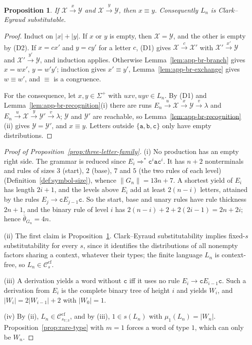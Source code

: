 \documentclass[11pt]{article}
\numberwithin{equation}{section}
\theoremstyle{plain}
\newtheorem{proposition}[theorem]{Proposition}
\theoremstyle{definition}
\theoremstyle{remark}
\theoremstyle{plain}
\newcommand{\cf}{\mathrm{cf}}
\newcommand{\Ccf}[1]{\mathcal C_{#1}^{\cf}}
\newcommand{\eps}{\lambda}
\begin{document}
\begin{proposition}\label{prop:app-br-congruence}
\label{prop:app-tl-congruence}
If $\mathcal X\xrightarrow{x}\mathcal Y$ and $\mathcal X\xrightarrow{y}\mathcal Y$, then $x\equiv y$.
Consequently $L_n$ is Clark--Eyraud substitutable.
\end{proposition}

\begin{proof}
Induct on $|x|+|y|$.  If $x$ or $y$ is empty, then $\mathcal X=\mathcal Y$, and the
other is empty by (D2).  If $x=cx'$ and $y=cy'$ for a letter $c$, (D1) gives
$\mathcal X\xrightarrow{c}\mathcal X'$ with $\mathcal X'\xrightarrow{x'}\mathcal Y$ and
$\mathcal X'\xrightarrow{y'}\mathcal Y$, and induction applies.  Otherwise
Lemma~\ref{lem:app-br-branch} gives $x=wx'$, $y=w'y'$; induction gives
$x'\equiv y'$, Lemma~\ref{lem:app-br-exchange} gives $w\equiv w'$, and $\equiv$ is a
congruence.

For the consequence, let $x,y\in\Sigma^+$ with $uxv,uyv\in L_n$.  By (D1) and
Lemma~\ref{lem:app-br-recognition}(i) there are runs
$E_n\xrightarrow{u}\mathcal X\xrightarrow{x}\mathcal Y\xrightarrow{v}\eps$ and
$E_n\xrightarrow{u}\mathcal X\xrightarrow{y}\mathcal Y'\xrightarrow{v}\eps$; $\mathcal Y$ and
$\mathcal Y'$ are reachable, so Lemma~\ref{lem:app-br-recognition}(ii) gives
$\mathcal Y=\mathcal Y'$, and $x\equiv y$.  Letters outside $\{\mathtt a,\mathtt b,\mathtt c\}$
only have empty distributions.
\end{proof}

\begin{proof}[Proof of Proposition~\ref{prop:three-letter-family}]
(i) No production has an empty right side.  The grammar is reduced since
$E_i\Rightarrow^*\mathtt c^i\mathtt a\mathtt c^i$.  It has $n+2$ nonterminals and
rules of sizes $3$ (start), $2$ (base), $7$ and $5$ (the two rules of each level)
(Definition~\ref{def:symbol-size}), whence $\|G_n\|=13n+7$.  A shortest yield
of $E_i$ has length $2i+1$, and the levels above $E_i$ add at least $2(n-i)$
letters, attained by the rules $E_j\to\mathtt cE_{j-1}\mathtt c$.  So the start, base
and unary rules have rule thickness $2n+1$, and the binary rule of level $i$ has
$2(n-i)+2+2(2i-1)=2n+2i$; hence $\bar\theta_{G_n}=4n$.

(ii) The first claim is Proposition~\ref{prop:app-br-congruence}.  Clark--Eyraud substitutability implies fixed-$s$
substitutability for every $s$, since it identifies the distributions of all
nonempty factors sharing a context, whatever their types; the finite language
$L_n$ is context-free, so $L_n\in\Ccf{s}$.

(iii) A derivation yields a word without $\mathtt c$ iff it uses no rule
$E_i\to\mathtt cE_{i-1}\mathtt c$.  Such a derivation from $E_i$ is the complete binary
tree of height $i$ and yields $W_i$, and $|W_i|=2|W_{i-1}|+2$ with $|W_0|=1$.

(iv) By (ii), $L_n\in\Ccf{s_{U,3}}$, and by (iii), $1\in s(L_n)$ with
$\mu_1(L_n)=|W_n|$.  Proposition~\ref{prop:rare-type} with $m=1$ forces a word of
type $1$, which can only be $W_n$.
\end{proof}
\end{document}
